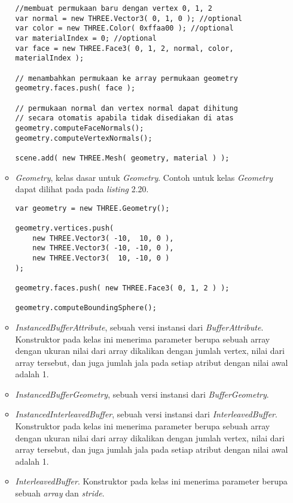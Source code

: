 \begin{itemize}
\begin{itemize}
\begin{lstlisting}[caption={Contoh penggunaan {\it Face3} pada suatu {\it Geometry}.},captionpos=b]
//membuat permukaan baru dengan vertex 0, 1, 2
var normal = new THREE.Vector3( 0, 1, 0 ); //optional
var color = new THREE.Color( 0xffaa00 ); //optional
var materialIndex = 0; //optional
var face = new THREE.Face3( 0, 1, 2, normal, color, materialIndex );

// menambahkan permukaan ke array permukaan geometry
geometry.faces.push( face );

// permukaan normal dan vertex normal dapat dihitung
// secara otomatis apabila tidak disediakan di atas
geometry.computeFaceNormals();
geometry.computeVertexNormals();

scene.add( new THREE.Mesh( geometry, material ) );
\end{lstlisting}

	\item{\it Geometry}, kelas dasar untuk {\it Geometry}. Contoh untuk kelas {\it Geometry} dapat dilihat pada pada {\it listing} 2.20.
\begin{lstlisting}[caption={Contoh instansiasi kelas {\it Geometry}.},captionpos=b]
var geometry = new THREE.Geometry();

geometry.vertices.push(
	new THREE.Vector3( -10,  10, 0 ),
	new THREE.Vector3( -10, -10, 0 ),
	new THREE.Vector3(  10, -10, 0 )
);

geometry.faces.push( new THREE.Face3( 0, 1, 2 ) );

geometry.computeBoundingSphere();
\end{lstlisting}

	\item{\it InstancedBufferAttribute}, sebuah versi instansi dari {\it BufferAttribute}. Konstruktor pada kelas ini menerima parameter berupa sebuah array dengan ukuran nilai dari array dikalikan dengan jumlah vertex, nilai dari array tersebut, dan juga jumlah jala pada setiap atribut dengan nilai awal adalah 1.
	
	\item{\it InstancedBufferGeometry}, sebuah versi instansi dari {\it BufferGeometry}.
	
	\item{\it InstancedInterleavedBuffer}, sebuah versi instansi dari {\it InterleavedBuffer}. Konstruktor pada kelas ini menerima parameter berupa sebuah array dengan ukuran nilai dari array dikalikan dengan jumlah vertex, nilai dari array tersebut, dan juga jumlah jala pada setiap atribut dengan nilai awal adalah 1.
	
	\item{\it InterleavedBuffer}. Konstruktor pada kelas ini menerima parameter berupa sebuah {\it array} dan {\it stride}.
	

\end{itemize}
\end{itemize}

